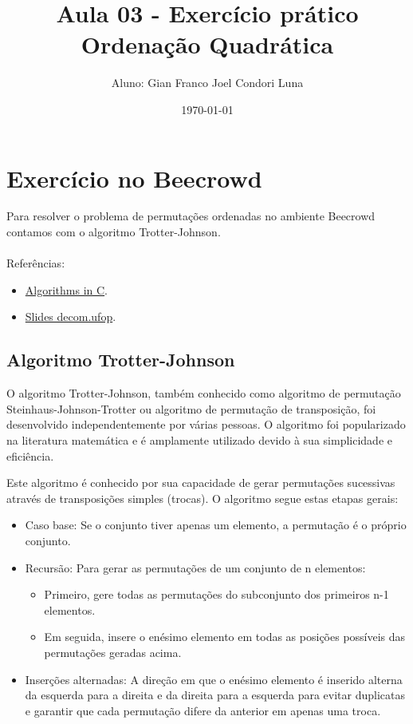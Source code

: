 \documentclass{article}
\title{Aula 03 - Exercício prático Ordenação Quadrática}
\author{Aluno: Gian Franco Joel Condori Luna}
\date{\today}
\begin{document}
\maketitle

\section*{Exercício no Beecrowd}

Para resolver o problema de permutações ordenadas no ambiente Beecrowd contamos com o algoritmo Trotter-Johnson.
\\
\\
Referências: 
\begin{itemize}
    \item \href{https://theswissbay.ch/pdf/Gentoomen%20Library/Algorithms/Algorithms%20in%20C.pdf}{Algorithms in C}.
    \item \href{https://www3.decom.ufop.br/toffolo/site_media/uploads/2011-1/bcc402/slides/07._recursao.pdf}{Slides decom.ufop}.
\end{itemize}

\setcounter{section}{01}

\subsection {Algoritmo Trotter-Johnson}

O algoritmo Trotter-Johnson, também conhecido como algoritmo de permutação Steinhaus-Johnson-Trotter ou 
algoritmo de permutação de transposição, foi desenvolvido independentemente por várias pessoas. O algoritmo 
foi popularizado na literatura matemática e é amplamente utilizado devido à sua simplicidade e eficiência.


Este algoritmo é conhecido por sua capacidade de gerar permutações sucessivas através de transposições 
simples (trocas). O algoritmo segue estas etapas gerais:

\begin{itemize}
    \item Caso base: Se o conjunto tiver apenas um elemento, a permutação é o próprio conjunto.

    \item Recursão: Para gerar as permutações de um conjunto de n elementos:
    \begin{itemize}
        \item Primeiro, gere todas as permutações do subconjunto dos primeiros n-1 elementos.
        \item Em seguida, insere o enésimo elemento em todas as posições possíveis das permutações geradas acima.
    \end{itemize}
    
    \item Inserções alternadas: A direção em que o enésimo elemento é inserido alterna da esquerda para a direita e da direita para a esquerda para evitar duplicatas e garantir que cada permutação difere da anterior em apenas uma troca.
\end{itemize}
\end{document}
